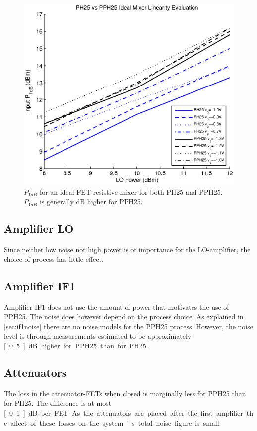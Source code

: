 			\begin{figure}[hbt!]
				\centering
				\includegraphics[width=1.0\textwidth]{fig/process/ph25vspph25}
				\caption[$P_{1dB}$ for an ideal FET resistive mixer for both PH25 and PPH25.]{$P_{1dB}$ for an ideal FET resistive mixer for both PH25 and PPH25. $P_{1dB}$ is generally \unit[1]{dB} higher for PPH25.}\label{fig:ph25vspph25}
			\end{figure}

		\subsection{Amplifier LO}
			Since neither low noise nor high power is of importance for the LO-amplifier, the choice of process has little effect.
			
		\subsection{Amplifier IF1}
			Amplifier IF1 does not use the amount of power that motivates the use of PPH25. The noise does however depend on the process choice. As explained in \autoref{sec:if1noise} there are no noise models for the PPH25 process. However, the noise level is through measurements estimated to be approximately \unit[0.5]{dB} higher for PPH25 than for PH25.
			
		\subsection{Attenuators}
			The loss in the attenuator-FETs when closed is marginally less for PPH25 than for PH25. The difference is at most \unit[0.1]{dB} per FET. As the attenuators are placed after the first amplifier the affect of these losses on the system's total noise figure is small.

